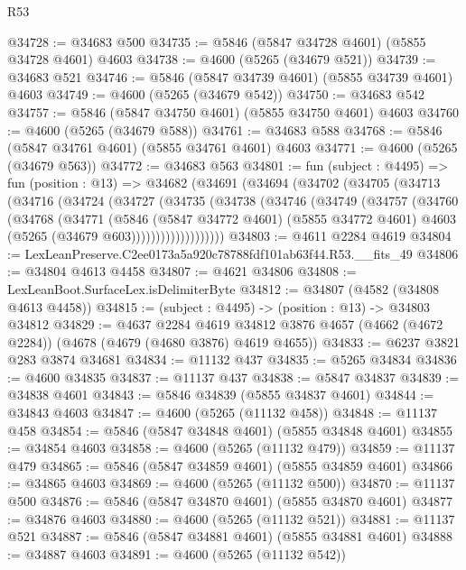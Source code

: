 \begin{lexlean}{R53}
\begin{coremodule}
@34728 := @34683 @500
@34735 := @5846 (@5847 @34728 @4601) (@5855 @34728 @4601) @4603
@34738 := @4600 (@5265 (@34679 @521))
@34739 := @34683 @521
@34746 := @5846 (@5847 @34739 @4601) (@5855 @34739 @4601) @4603
@34749 := @4600 (@5265 (@34679 @542))
@34750 := @34683 @542
@34757 := @5846 (@5847 @34750 @4601) (@5855 @34750 @4601) @4603
@34760 := @4600 (@5265 (@34679 @588))
@34761 := @34683 @588
@34768 := @5846 (@5847 @34761 @4601) (@5855 @34761 @4601) @4603
@34771 := @4600 (@5265 (@34679 @563))
@34772 := @34683 @563
@34801 := fun (subject : @4495) =>
  fun (position : @13) =>
  @34682
    (@34691
      (@34694
        (@34702
          (@34705
            (@34713
              (@34716
                (@34724
                  (@34727
                    (@34735
                      (@34738
                        (@34746
                          (@34749
                            (@34757
                              (@34760
                                (@34768
                                  (@34771
                                    (@5846
                                      (@5847 @34772 @4601)
                                      (@5855 @34772 @4601)
                                      @4603
                                      (@5265 (@34679 @603)))))))))))))))))))
@34803 := @4611 @2284 @4619
@34804 := LexLeanPreserve.C2ee0173a5a920c78788fdf101ab63f44.R53.__fits_49
@34806 := @34804 @4613 @4458
@34807 := @4621 @34806
@34808 := LexLeanBoot.SurfaceLex.isDelimiterByte
@34812 := @34807 (@4582 (@34808 @4613 @4458))
@34815 := (subject : @4495) -> (position : @13) -> @34803 @34812
@34829 := @4637
    @2284
    @4619
    @34812
    @3876
    @4657
    (@4662 (@4672 @2284))
    (@4678 (@4679 (@4680 @3876) @4619 @4655))
@34833 := @6237 @3821 @283 @3874 @34681
@34834 := @11132 @437
@34835 := @5265 @34834
@34836 := @4600 @34835
@34837 := @11137 @437
@34838 := @5847 @34837
@34839 := @34838 @4601
@34843 := @5846 @34839 (@5855 @34837 @4601)
@34844 := @34843 @4603
@34847 := @4600 (@5265 (@11132 @458))
@34848 := @11137 @458
@34854 := @5846 (@5847 @34848 @4601) (@5855 @34848 @4601)
@34855 := @34854 @4603
@34858 := @4600 (@5265 (@11132 @479))
@34859 := @11137 @479
@34865 := @5846 (@5847 @34859 @4601) (@5855 @34859 @4601)
@34866 := @34865 @4603
@34869 := @4600 (@5265 (@11132 @500))
@34870 := @11137 @500
@34876 := @5846 (@5847 @34870 @4601) (@5855 @34870 @4601)
@34877 := @34876 @4603
@34880 := @4600 (@5265 (@11132 @521))
@34881 := @11137 @521
@34887 := @5846 (@5847 @34881 @4601) (@5855 @34881 @4601)
@34888 := @34887 @4603
@34891 := @4600 (@5265 (@11132 @542))

\end{coremodule}
\end{lexlean}
